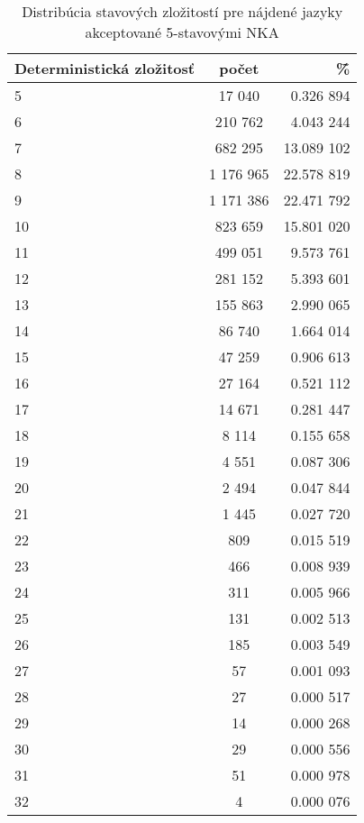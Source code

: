 \begin{table}[H]
  \centering
  \begin{tabular}{|l|c|r|}
    \hline
    Deterministická zložitosť & počet & \~\% \\ 
    \hline
    5 & 17 040 & 0.326 894 \\
    \hline
    6 & 210 762 & 4.043 244 \\
    \hline
    7 & 682 295 & 13.089 102 \\
    \hline
    8 & 1 176 965 & 22.578 819 \\
    \hline
    9 & 1 171 386 & 22.471 792 \\
    \hline
    10 & 823 659 & 15.801 020 \\
    \hline
    11 & 499 051& 9.573 761 \\
    \hline
    12 & 281 152 & 5.393 601 \\
    \hline
    13 & 155 863 & 2.990 065 \\
    \hline
    14 & 86 740 & 1.664 014 \\
    \hline
    15 & 47 259 & 0.906 613 \\
    \hline
    16 & 27 164 & 0.521 112 \\
    \hline
    17 & 14 671 & 0.281 447 \\
    \hline
    18 & 8 114 & 0.155 658 \\
    \hline
    19 & 4 551 & 0.087 306 \\
    \hline
    20 & 2 494 & 0.047 844 \\
    \hline
    21 & 1 445 & 0.027 720 \\
    \hline
    22 & 809 & 0.015 519 \\
    \hline
    23 & 466 & 0.008 939 \\
    \hline
    24 & 311 & 0.005 966 \\
    \hline
    25 & 131 & 0.002 513 \\
    \hline
    26 & 185 & 0.003 549 \\
    \hline
    27 & 57 & 0.001 093 \\
    \hline
    28 & 27 & 0.000 517 \\
    \hline
    29 & 14 & 0.000 268 \\
    \hline
    30 & 29 & 0.000 556 \\
    \hline
    31 & 51 & 0.000 978 \\
    \hline
    32 & 4 & 0.000 076 \\
    \hline
  \end{tabular}
  \caption{Distribúcia stavových zložitostí pre nájdené jazyky akceptované 5-stavovými NKA}
\end{table}



